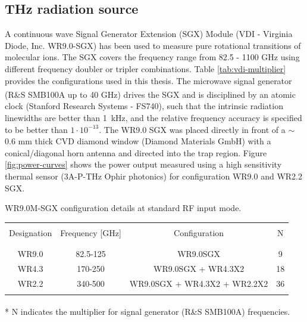 \subsection{THz radiation source}
\label{subsec:rot:radiation-source}

A continuous wave Signal Generator Extension (SGX) Module (VDI - Virginia Diode, Inc. WR9.0-SGX) has been used to measure pure rotational transitions of molecular ions. The SGX covers the frequency range from 82.5 - 1100 GHz using different frequency doubler or tripler combinations. Table \ref{tab:vdi-multiplier} provides the configurations used in this thesis. The microwave signal generator (R\&S \textsuperscript{\textregistered} SMB100A up to 40 GHz) drives the SGX and is disciplined by an atomic clock (Stanford Research Systems - FS740), such that the intrinsic radiation linewidths are better than 1~kHz, and the relative frequency accuracy is specified to be better than $1\cdot 10^{-13}$. The WR9.0 SGX was placed directly in front of a $\sim$ 0.6 mm thick CVD diamond window (Diamond Materials GmbH) with a conical/diagonal horn antenna and directed into the trap region. Figure \ref{fig:power-curves} shows the power output measured using a high sensitivity thermal sensor (3A-P-THz Ophir photonics) for configuration WR9.0 and WR2.2 SGX.

\begin{threeparttable}[!htb]
    \centering
    \caption{WR9.0M-SGX configuration details at standard RF input mode. }
    \begin{tabular}{cccc}
        \hline\\
        Designation & Frequency [GHz] & Configuration & N\tnote{*} \\
        \\\hline\hline\\
        WR9.0 & 82.5-125 & WR9.0SGX & 9 \\
        WR4.3 & 170-250 & WR9.0SGX + WR4.3X2 & 18 \\
        WR2.2 & 340-500 & WR9.0SGX + WR4.3X2 + WR2.2X2 & 36 \\
        \\\hline\hline
    \end{tabular}
    \begin{tablenotes}
        \item[*] N indicates the multiplier for signal generator (R\&S \textsuperscript{\textregistered} SMB100A) frequencies.\\
    \end{tablenotes}
    \label{tab:vdi-multiplier}
\end{threeparttable}


